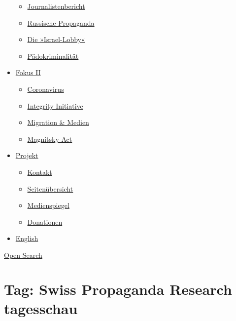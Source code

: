 \begin{itemize}
  \begin{itemize}
  \tightlist
  \item
    \href{https://swprs.org/bericht-eines-journalisten/}{Journalistenbericht}
  \item
    \href{https://swprs.org/russische-propaganda/}{Russische Propaganda}
  \item
    \href{https://swprs.org/die-israel-lobby-fakten-und-mythen/}{Die
    »Israel-Lobby«}
  \item
    \href{https://swprs.org/geopolitik-und-paedokriminalitaet/}{Pädokriminalität}
  \end{itemize}
\item
  \href{https://swprs.org/migration-und-medien/}{Fokus II}

  \begin{itemize}
  \tightlist
  \item
    \href{https://swprs.org/covid-19-hinweis-ii/}{Coronavirus}
  \item
    \href{https://swprs.org/die-integrity-initiative/}{Integrity
    Initiative}
  \item
    \href{https://swprs.org/migration-und-medien/}{Migration \& Medien}
  \item
    \href{https://swprs.org/der-fall-magnitsky/}{Magnitsky Act}
  \end{itemize}
\item
  \href{https://swprs.org/kontakt/}{Projekt}

  \begin{itemize}
  \tightlist
  \item
    \href{https://swprs.org/kontakt/}{Kontakt}
  \item
    \href{https://swprs.org/uebersicht/}{Seitenübersicht}
  \item
    \href{https://swprs.org/medienspiegel/}{Medienspiegel}
  \item
    \href{https://swprs.org/donationen/}{Donationen}
  \end{itemize}
\item
  \href{https://swprs.org/contact/}{English}
\end{itemize}

\protect\hyperlink{}{Open Search}

\hypertarget{tag-swiss-propaganda-research-tagesschau}{%
\section{Tag: Swiss Propaganda Research
tagesschau}\label{tag-swiss-propaganda-research-tagesschau}}


